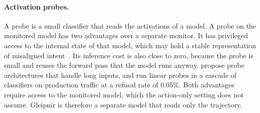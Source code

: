 \paragraph{Activation probes.}
A probe is a small classifier that reads the activations of a model.
A probe on the monitored model has two advantages over a separate monitor.
It has privileged access to the internal state of that model, which may hold a stable representation of misaligned intent~\citep{goldowskydill2025detecting}.
Its inference cost is also close to zero, because the probe is small and reuses the forward pass that the model runs anyway.
\citet{kramar2026building} propose probe architectures that handle long inputs, and \citet{cunningham2026constitutional} run linear probes in a cascade of classifiers on production traffic at a refusal rate of 0.05\%.
Both advantages require access to the monitored model, which the action-only setting does not assume.
Gleipnir is therefore a separate model that reads only the trajectory.
